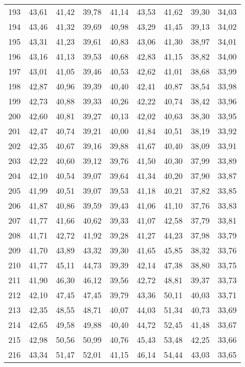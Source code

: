\begin{longtable}{c c c c c c c c c}
193	& 43,61	& 41,42	& 39,78	& 41,14	& 43,53	& 41,62	& 39,30	& 34,03 \\
194	& 43,46	& 41,32	& 39,69	& 40,98	& 43,29	& 41,45	& 39,13	& 34,02 \\
195	& 43,31	& 41,23	& 39,61	& 40,83	& 43,06	& 41,30	& 38,97	& 34,01 \\
196	& 43,16	& 41,13	& 39,53	& 40,68	& 42,83	& 41,15	& 38,82	& 34,00 \\
197	& 43,01	& 41,05	& 39,46	& 40,53	& 42,62	& 41,01	& 38,68	& 33,99 \\
198	& 42,87	& 40,96	& 39,39	& 40,40	& 42,41	& 40,87	& 38,54	& 33,98 \\
199	& 42,73	& 40,88	& 39,33	& 40,26	& 42,22	& 40,74	& 38,42	& 33,96 \\
200	& 42,60	& 40,81	& 39,27	& 40,13	& 42,02	& 40,63	& 38,30	& 33,95 \\
201	& 42,47	& 40,74	& 39,21	& 40,00	& 41,84	& 40,51	& 38,19	& 33,92 \\
202	& 42,35	& 40,67	& 39,16	& 39,88	& 41,67	& 40,40	& 38,09	& 33,91 \\
203	& 42,22	& 40,60	& 39,12	& 39,76	& 41,50	& 40,30	& 37,99	& 33,89 \\
204	& 42,10	& 40,54	& 39,07	& 39,64	& 41,34	& 40,20	& 37,90	& 33,87 \\
205	& 41,99	& 40,51	& 39,07	& 39,53	& 41,18	& 40,21	& 37,82	& 33,85 \\
206	& 41,87	& 40,86	& 39,59	& 39,43	& 41,06	& 41,10	& 37,76	& 33,83 \\
207	& 41,77	& 41,66	& 40,62	& 39,33	& 41,07	& 42,58	& 37,79	& 33,81 \\
208	& 41,71	& 42,72	& 41,92	& 39,28	& 41,27	& 44,23	& 37,98	& 33,79 \\
209	& 41,70	& 43,89	& 43,32	& 39,30	& 41,65	& 45,85	& 38,32	& 33,76 \\
210	& 41,77	& 45,11	& 44,73	& 39,39	& 42,14	& 47,38	& 38,80	& 33,75 \\
211	& 41,90	& 46,30	& 46,12	& 39,56	& 42,72	& 48,81	& 39,37	& 33,73 \\
212	& 42,10	& 47,45	& 47,45	& 39,79	& 43,36	& 50,11	& 40,03	& 33,71 \\
213	& 42,35	& 48,55	& 48,71	& 40,07	& 44,03	& 51,34	& 40,73	& 33,69 \\
214	& 42,65	& 49,58	& 49,88	& 40,40	& 44,72	& 52,45	& 41,48	& 33,67 \\
215	& 42,98	& 50,56	& 50,99	& 40,76	& 45,43	& 53,48	& 42,25	& 33,66 \\
216	& 43,34	& 51,47	& 52,01	& 41,15	& 46,14	& 54,44	& 43,03	& 33,65 \\

\end{longtable}

